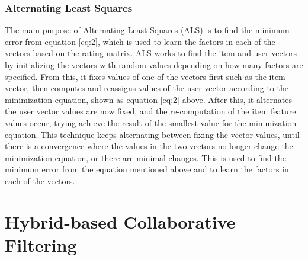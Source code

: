 

\subsubsection{Alternating Least Squares} \label{als}

The main purpose of Alternating Least Squares (ALS) is to find the minimum error from equation \ref{eq:2}, which is used to learn the factors in each of the vectors based on the rating matrix. ALS works to find the item and user vectors by initializing the vectors with random values depending on how many factors are specified. From this, it fixes values of one of the vectors first such as the item vector, then computes and reassigns values of the user vector according to the minimization equation, shown as equation \ref{eq:2} above. After this, it alternates - the user vector values are now fixed, and the re-computation of the item feature values occur, trying achieve the result of the smallest value for the minimization equation. This technique keeps alternating between fixing the vector values, until there is a convergence where the values in the two vectors no longer change the minimization equation, or there are minimal changes. This is used to find the minimum error from the equation mentioned above and to learn the factors in each of the vectors. 


\section{Hybrid-based Collaborative Filtering}

